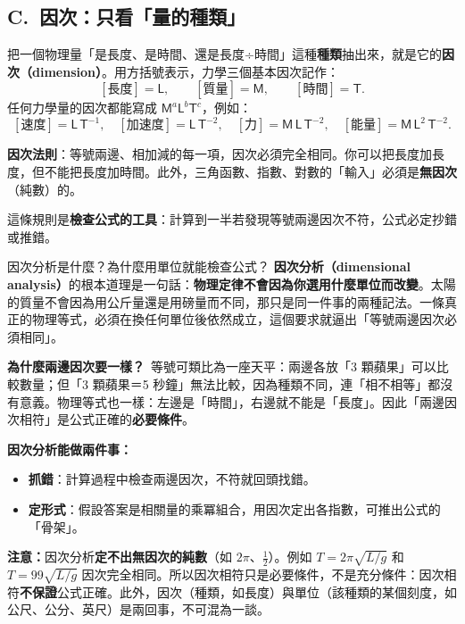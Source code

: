 \documentclass[11pt]{article}
\begin{document}
\subsection*{\sffamily C.\ 因次：只看「量的種類」}

把一個物理量「是長度、是時間、還是長度÷時間」這種\textbf{種類}抽出來，就是它的\textbf{因次（dimension）}。用方括號表示，力學三個基本因次記作：
$$[\text{長度}]=\mathsf{L},\qquad [\text{質量}]=\mathsf{M},\qquad [\text{時間}]=\mathsf{T}.$$
任何力學量的因次都能寫成 $\mathsf{M}^a\mathsf{L}^b\mathsf{T}^c$，例如：
$$[\text{速度}]=\mathsf{L}\,\mathsf{T}^{-1},\quad
[\text{加速度}]=\mathsf{L}\,\mathsf{T}^{-2},\quad
[\text{力}]=\mathsf{M}\,\mathsf{L}\,\mathsf{T}^{-2},\quad
[\text{能量}]=\mathsf{M}\,\mathsf{L}^2\,\mathsf{T}^{-2}.$$

\textbf{因次法則}：等號兩邊、相加減的每一項，因次必須完全相同。你可以把長度加長度，但不能把長度加時間。此外，三角函數、指數、對數的「輸入」必須是\textbf{無因次}（純數）的。

這條規則是\textbf{檢查公式的工具}：計算到一半若發現等號兩邊因次不符，公式必定抄錯或推錯。

\begin{補充框}{因次分析是什麼？為什麼用單位就能檢查公式？}
\textbf{因次分析（dimensional analysis）}的根本道理是一句話：\textbf{物理定律不會因為你選用什麼單位而改變}。太陽的質量不會因為用公斤量還是用磅量而不同，那只是同一件事的兩種記法。一條真正的物理等式，必須在換任何單位後依然成立，這個要求就逼出「等號兩邊因次必須相同」。

\textbf{為什麼兩邊因次要一樣？}\ 等號可類比為一座天平：兩邊各放「3 顆蘋果」可以比較數量；但「3 顆蘋果＝5 秒鐘」無法比較，因為種類不同，連「相不相等」都沒有意義。物理等式也一樣：左邊是「時間」，右邊就不能是「長度」。因此「兩邊因次相符」是公式正確的\textbf{必要條件}。

\textbf{因次分析能做兩件事：}
\begin{itemize}\setlength{\itemsep}{1pt}
\item \textbf{抓錯}：計算過程中檢查兩邊因次，不符就回頭找錯。
\item \textbf{定形式}：假設答案是相關量的乘冪組合，用因次定出各指數，可推出公式的「骨架」。
\end{itemize}

\textbf{注意：}因次分析\textbf{定不出無因次的純數}（如 $2\pi$、$\tfrac12$）。例如 $T=2\pi\sqrt{L/g}$ 和 $T=99\sqrt{L/g}$ 因次完全相同。所以因次相符只是必要條件，不是充分條件：因次相符\textbf{不保證}公式正確。此外，因次（種類，如長度）與單位（該種類的某個刻度，如公尺、公分、英尺）是兩回事，不可混為一談。
\end{補充框}
\end{document}
